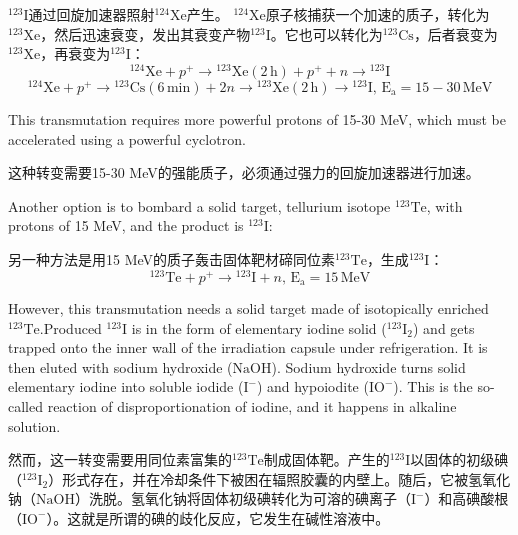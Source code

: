 \documentclass[dvipsnames, svgnames,a4paper,11pt]{article}
\begin{document}
\(\mathrm{^{123}I}\)通过回旋加速器照射\(\mathrm{^{124}Xe}\)产生。 \(\mathrm{^{124}Xe}\)原子核捕获一个加速的质子，转化为\(\mathrm{^{123}Xe}\)，然后迅速衰变，发出其衰变产物\(\mathrm{^{123}I}\)。它也可以转化为\(\mathrm{^{123}Cs}\)，后者衰变为\(\mathrm{^{123}Xe}\)，再衰变为\(\mathrm{^{123}I}\)：
\[
\mathrm{^{124}Xe} + p^{+} \rightarrow \mathrm{^{123}Xe} (2 \, \text{h}) + p^{+} + n \rightarrow \mathrm{^{123}I}
\]
\[
\mathrm{^{124}Xe} + p^{+} \rightarrow \mathrm{^{123}Cs} (6 \, \text{min}) + 2n \rightarrow \mathrm{^{123}Xe} (2 \, \text{h}) \rightarrow \mathrm{^{123}I}, \, \mathrm{E_a} = 15-30 \, \text{MeV}
\]

This transmutation requires more powerful protons of 15-30 MeV, which must be accelerated using a powerful cyclotron.

这种转变需要15-30 MeV的强能质子，必须通过强力的回旋加速器进行加速。

Another option is to bombard a solid target, tellurium isotope \(\mathrm{^{123}Te}\), with protons of 15 MeV, and the product is \(\mathrm{^{123}I}\):

另一种方法是用15 MeV的质子轰击固体靶材碲同位素\(\mathrm{^{123}Te}\)，生成\(\mathrm{^{123}I}\)：
\[
\mathrm{^{123}Te} + p^{+} \rightarrow \mathrm{^{123}I} + n, \, \mathrm{E_a} = 15 \, \text{MeV}
\]

However, this transmutation needs a solid target made of isotopically enriched \(\mathrm{^{123}Te}\).Produced \(\mathrm{^{123}I}\) is in the form of elementary iodine solid (\(\mathrm{^{123}I_2}\)) and gets trapped onto the inner wall of the irradiation capsule under refrigeration. It is then eluted with sodium hydroxide (\(\mathrm{NaOH}\)). Sodium hydroxide turns solid elementary iodine into soluble iodide (\(\mathrm{I^{-}}\)) and hypoiodite (\(\mathrm{IO^{-}}\)). This is the so-called reaction of disproportionation of iodine, and it happens in alkaline solution.

然而，这一转变需要用同位素富集的\(\mathrm{^{123}Te}\)制成固体靶。产生的\(\mathrm{^{123}I}\)以固体的初级碘（\(\mathrm{^{123}I_2}\)）形式存在，并在冷却条件下被困在辐照胶囊的内壁上。随后，它被氢氧化钠（\(\mathrm{NaOH}\)）洗脱。氢氧化钠将固体初级碘转化为可溶的碘离子（\(\mathrm{I^{-}}\)）和高碘酸根（\(\mathrm{IO^{-}}\)）。这就是所谓的碘的歧化反应，它发生在碱性溶液中。
\end{document}
